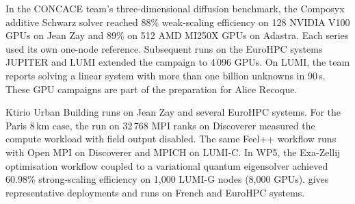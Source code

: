 In the CONCACE team's three-dimensional diffusion benchmark, the
Composyx additive Schwarz solver reached 88\% weak-scaling efficiency
on 128 NVIDIA V100 GPUs on Jean Zay and 89\% on 512 AMD MI250X GPUs on
Adastra. Each series used its own one-node reference. Subsequent runs
on the EuroHPC systems JUPITER and LUMI extended the campaign to
4\,096 GPUs. On LUMI, the team reports solving a linear system with
more than one billion unknowns in 90\,s. These GPU campaigns are part
of the preparation for Alice Recoque.

Ktirio Urban Building runs on Jean Zay and several EuroHPC systems.
For the Paris 8\,km case, the run on 32\,768 MPI ranks on Discoverer
measured the compute workload with field output disabled. The same
Feel++ workflow runs with Open MPI on Discoverer and MPICH on LUMI-C.
In WP5, the Exa-Zellij optimisation workflow coupled to a variational
quantum eigensolver achieved 60.98\% strong-scaling efficiency
on 1,000 LUMI-G nodes (8,000 GPUs).
 gives representative deployments
and runs on French and EuroHPC systems.

